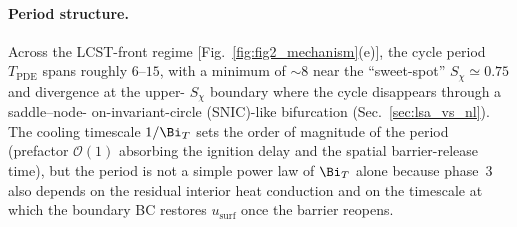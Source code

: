 \paragraph{Period structure.}  Across the LCST-front regime
[Fig.~\ref{fig:fig2_mechanism}(e)], the cycle period $T_\mathrm{PDE}$
spans roughly $6$--$15$, with a minimum of $\sim\!8$ near the
``sweet-spot'' $S_\chi\!\simeq\!0.75$ and divergence at the upper-
$S_\chi$ boundary where the cycle disappears through a saddle--node-
on-invariant-circle (SNIC)-like bifurcation
(Sec.~\ref{sec:lsa_vs_nl}).  The cooling timescale $1/\Bi_T$ sets the
order of magnitude of the period (prefactor $\mathcal{O}(1)$
absorbing the ignition delay and the spatial barrier-release time),
but the period is not a simple power law of $\Bi_T$ alone because
phase~3 also depends on the residual interior heat conduction and on
the timescale at which the boundary BC restores
$u_\mathrm{surf}$ once the barrier reopens.
